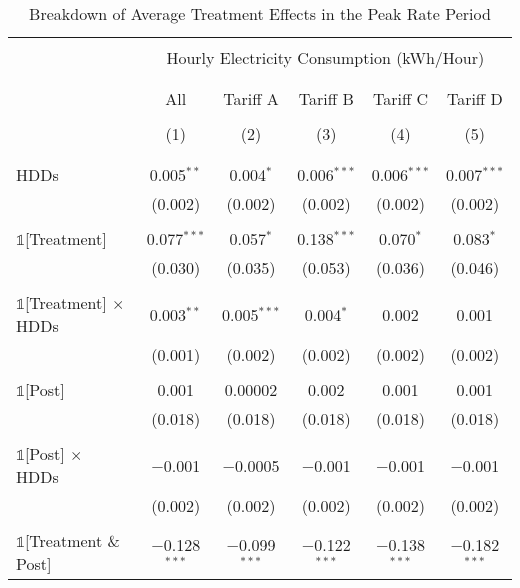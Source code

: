 \begin{table}[!htbp]
\caption{Breakdown of Average Treatment Effects in the Peak Rate Period}
\centering
\footnotesize
\begin{tabular}{@{\extracolsep{10pt}}lccccc}
\\[-5.5ex]
\hline \hline
\\[-3.0ex]
& \multicolumn{5}{c}{Hourly Electricity Consumption  (kWh/Hour)} \\
\\[-3.0ex]
\cline{2-6}
\\[-3.0ex]
& All & Tariff A & Tariff B & Tariff C & Tariff D \\
\\[-4.0ex]
 & (1) & (2) & (3) & (4) & (5) \\
\\[-3.0ex]
\hline
\\[-2.0ex]
HDDs & 0.005$^{**}$ & 0.004$^{*}$ & 0.006$^{***}$ & 0.006$^{***}$ & 0.007$^{***}$  \\
& (0.002) & (0.002) & (0.002) & (0.002) & (0.002)  \\
& & \\
$\mathbb{1}$[Treatment] & 0.077$^{***}$ & 0.057$^{*}$ & 0.138$^{***}$ & 0.070$^{*}$ & 0.083$^{*}$ \\
& (0.030) & (0.035) & (0.053) & (0.036) & (0.046) \\
& & \\
$\mathbb{1}$[Treatment] $\times$ HDDs & 0.003$^{**}$ & 0.005$^{***}$ & 0.004$^{*}$ & 0.002 & 0.001 \\
& (0.001) & (0.002) & (0.002) & (0.002) & (0.002) \\
& & \\
$\mathbb{1}$[Post] & 0.001 & 0.00002 & 0.002 & 0.001 & 0.001 \\
& (0.018) & (0.018) & (0.018) & (0.018) & (0.018) \\
& & \\
$\mathbb{1}$[Post] $\times$ HDDs & $-$0.001 & $-$0.0005 & $-$0.001 & $-$0.001 & $-$0.001 \\
& (0.002) & (0.002) & (0.002) & (0.002) & (0.002) \\
& & \\
$\mathbb{1}$[Treatment \& Post] & $-$0.128$^{***}$ & $-$0.099$^{***}$ & $-$0.122$^{***}$ & $-$0.138$^{***}$ & $-$0.182$^{***}$ \\

\end{tabular}
\end{table}
